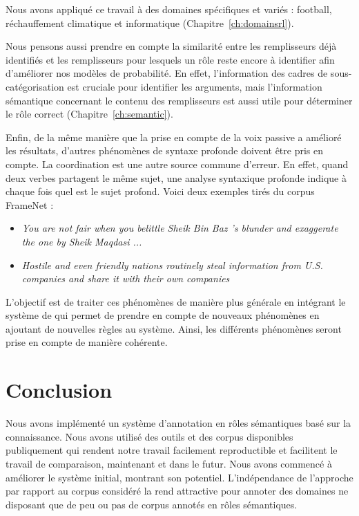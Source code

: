 Nous avons appliqué ce travail à des domaines spécifiques et variés : football,
réchauffement climatique et informatique (Chapitre~\ref{ch:domainsrl}).

Nous pensons aussi prendre en compte la similarité entre les remplisseurs déjà
identifiés et les remplisseurs pour lesquels un rôle reste encore à identifier
afin d'améliorer nos modèles de probabilité. En effet, l'information des cadres
de sous-catégorisation est cruciale pour identifier les arguments, mais
l'information sémantique concernant le contenu des remplisseurs est aussi utile
pour déterminer le rôle correct (Chapitre~\ref{ch:semantic}).

Enfin, de la même manière que la prise en compte de la voix passive a amélioré
les résultats, d'autres phénomènes de syntaxe profonde doivent être pris en
compte. La coordination est une autre source commune d'erreur. En effet, quand
deux verbes partagent le même sujet, une analyse syntaxique profonde indique à
chaque fois quel est le sujet profond. Voici deux exemples tirés du corpus
FrameNet :

\begin{itemize}

    \item \emph{You are not fair when you belittle Sheik Bin Baz 's blunder and
        exaggerate the one by Sheik Maqdasi ...}

    \item \emph{Hostile and even friendly nations routinely steal information
        from U.S. companies and share it with their own companies}

\end{itemize}

L'objectif est de traiter ces phénomènes de manière plus générale en intégrant
le système de \cite{ribeyre2013systeme} qui permet de prendre en compte de
nouveaux phénomènes en ajoutant de nouvelles règles au système. Ainsi, les
différents phénomènes seront prise en compte de manière cohérente.

\section{Conclusion}

Nous avons implémenté un système d'annotation en rôles sémantiques basé sur la
connaissance. Nous avons utilisé des outils et des corpus disponibles
publiquement qui rendent notre travail facilement reproductible et facilitent
le travail de comparaison, maintenant et dans le futur. Nous avons commencé à
améliorer le système initial, montrant son potentiel. L'indépendance de
l'approche par rapport au corpus considéré la rend attractive pour annoter des
domaines ne disposant que de peu ou pas de corpus annotés en rôles sémantiques.
